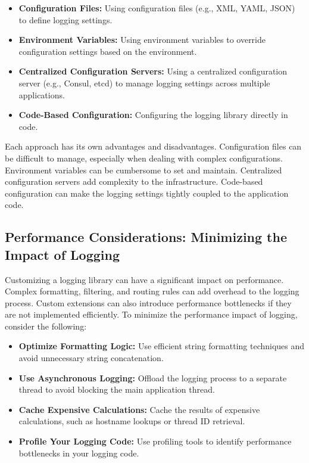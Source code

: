 \documentclass{article}
\begin{document}
{{{{\begin{itemize}
    \item \textbf{Configuration Files:} Using configuration files (e.g., XML, YAML, JSON) to define logging settings.
    \item \textbf{Environment Variables:} Using environment variables to override configuration settings based on the environment.
    \item \textbf{Centralized Configuration Servers:} Using a centralized configuration server (e.g., Consul, etcd) to manage logging settings across multiple applications.
    \item \textbf{Code-Based Configuration:} Configuring the logging library directly in code.
\end{itemize}

Each approach has its own advantages and disadvantages. Configuration files can be difficult to manage, especially when dealing with complex configurations. Environment variables can be cumbersome to set and maintain. Centralized configuration servers add complexity to the infrastructure. Code-based configuration can make the logging settings tightly coupled to the application code.

\subsection*{Performance Considerations: Minimizing the Impact of Logging}

Customizing a logging library can have a significant impact on performance. Complex formatting, filtering, and routing rules can add overhead to the logging process. Custom extensions can also introduce performance bottlenecks if they are not implemented efficiently. To minimize the performance impact of logging, consider the following:

\begin{itemize}
    \item \textbf{Optimize Formatting Logic:} Use efficient string formatting techniques and avoid unnecessary string concatenation.
    \item \textbf{Use Asynchronous Logging:} Offload the logging process to a separate thread to avoid blocking the main application thread.
    \item \textbf{Cache Expensive Calculations:} Cache the results of expensive calculations, such as hostname lookups or thread ID retrieval.
    \item \textbf{Profile Your Logging Code:} Use profiling tools to identify performance bottlenecks in your logging code.
\end{itemize}

}}}}
\end{document}
